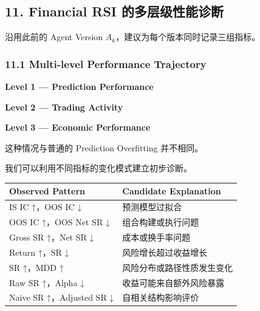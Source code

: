 \hypertarget{part-4-67-0001-financial-rsi-ux7684ux591aux5c42ux7ea7ux6027ux80fdux8bcaux65ad}{%
\subsection{11. Financial RSI 的多层级性能诊断}\label{part-4-67-0001-financial-rsi-ux7684ux591aux5c42ux7ea7ux6027ux80fdux8bcaux65ad}}

沿用此前的 Agent Version \(A_k\)，建议为每个版本同时记录三组指标。

\hypertarget{part-4-67-0001-multi-level-performance-trajectory}{%
\subsubsection{11.1 Multi-level Performance Trajectory}\label{part-4-67-0001-multi-level-performance-trajectory}}

\textbf{Level 1 --- Prediction Performance}


\textbf{Level 2 --- Trading Activity}


\textbf{Level 3 --- Economic Performance}


这种情况与普通的 Prediction Overfitting 并不相同。

我们可以利用不同指标的变化模式建立初步诊断。

\begin{readertable}
\begin{longtable}[]{@{}
  >{\raggedright\arraybackslash}p{}
  >{\raggedright\arraybackslash}p{}@{}}
\toprule
Observed Pattern & Candidate Explanation \\
\midrule
\endhead
IS IC ↑，OOS IC ↓ & 预测模型过拟合 \\
OOS IC ↑，OOS Net SR ↓ & 组合构建或执行问题 \\
Gross SR ↑，Net SR ↓ & 成本或换手率问题 \\
Return ↑，SR ↓ & 风险增长超过收益增长 \\
SR ↑，MDD ↑ & 风险分布或路径性质发生变化 \\
Raw SR ↑，Alpha ↓ & 收益可能来自额外风险暴露 \\
Naive SR ↑，Adjusted SR ↓ & 自相关结构影响评价 \\
\bottomrule
\end{longtable}
\end{readertable}

